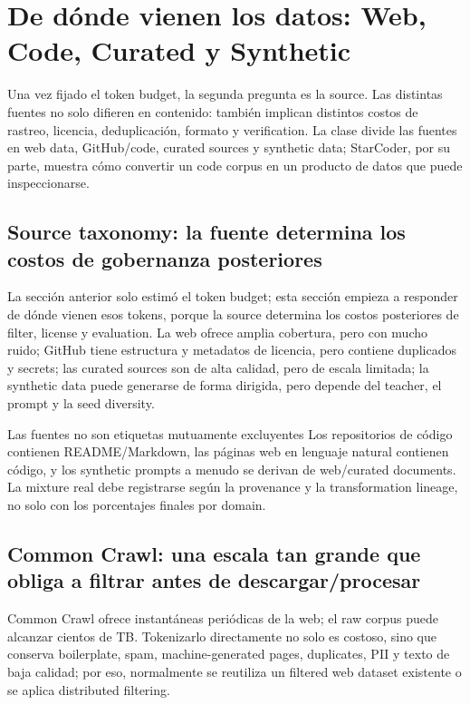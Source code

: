 \section{De dónde vienen los datos: Web, Code, Curated y Synthetic}

Una vez fijado el token budget, la segunda pregunta es la source. Las distintas fuentes no solo difieren en contenido: también implican distintos costos de rastreo, licencia, deduplicación, formato y verification. La clase divide las fuentes en web data, GitHub/code, curated sources y synthetic data; StarCoder, por su parte, muestra cómo convertir un code corpus en un producto de datos que puede inspeccionarse.

\subsection{Source taxonomy: la fuente determina los costos de gobernanza posteriores}

La sección anterior solo estimó el token budget; esta sección empieza a responder de dónde vienen esos tokens, porque la source determina los costos posteriores de filter, license y evaluation. La web ofrece amplia cobertura, pero con mucho ruido; GitHub tiene estructura y metadatos de licencia, pero contiene duplicados y secrets; las curated sources son de alta calidad, pero de escala limitada; la synthetic data puede generarse de forma dirigida, pero depende del teacher, el prompt y la seed diversity.


\begin{knowledgebox}{Las fuentes no son etiquetas mutuamente excluyentes}
Los repositorios de código contienen README/Markdown, las páginas web en lenguaje natural contienen código, y los synthetic prompts a menudo se derivan de web/curated documents. La mixture real debe registrarse según la provenance y la transformation lineage, no solo con los porcentajes finales por domain.
\end{knowledgebox}

\subsection{Common Crawl: una escala tan grande que obliga a filtrar antes de descargar/procesar}

Common Crawl ofrece instantáneas periódicas de la web; el raw corpus puede alcanzar cientos de TB. Tokenizarlo directamente no solo es costoso, sino que conserva boilerplate, spam, machine-generated pages, duplicates, PII y texto de baja calidad; por eso, normalmente se reutiliza un filtered web dataset existente o se aplica distributed filtering.

